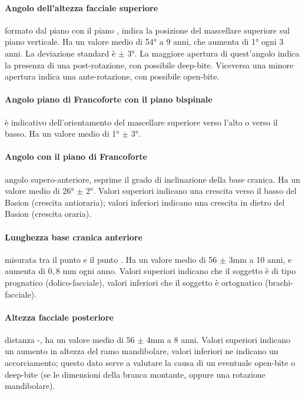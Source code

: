 \paragraph{Angolo dell'altezza facciale superiore} formato dal piano  con il piano , indica la posizione del mascellare superiore sul piano verticale. Ha un valore medio di 54° a 9 anni, che aumenta di 1° ogni 3 anni. La deviazione standard è $\pm$ 3°. La maggiore apertura di quest'angolo indica la presenza di una post-rotazione, con possibile deep-bite. Viceversa una minore apertura indica una ante-rotazione, con possibile open-bite.

\paragraph{Angolo piano di Francoforte con il piano bispinale} è indicativo dell'o\-ri\-en\-ta\-men\-to del mascellare superiore verso l'alto o verso il basso. Ha un valore medio di 1° $\pm$ 3°.

\paragraph{Angolo  con il piano di Francoforte} angolo supero-anteriore, esprime il grado di inclinazione della base cranica. Ha un valore medio di 26° $\pm$ 2°. Valori superiori indicano una crescita verso il basso del Basion (crescita antioraria); valori inferiori indicano una crescita in dietro del Basion (crescita oraria).

\paragraph{Lunghezza base cranica anteriore} misurata tra il punto  e il punto . Ha un valore medio di 56 $\pm$ 3mm a 10 anni, e aumenta di $0,8$ mm ogni anno. Valori superiori indicano che il soggetto è di tipo prognatico (dolico-facciale), valori inferiori che il soggetto è ortognatico (brachi-facciale).

\paragraph{Altezza facciale posteriore} distanza -, ha un valore medio di 56 $\pm$ 4mm a 8 anni. Valori superiori indicano un aumento in altezza del ramo mandibolare, valori inferiori ne indicano un accorciamento; questo dato serve a valutare la causa di un eventuale open-bite o deep-bite (se le dimensioni della branca montante, oppure una rotazione mandibolare).

